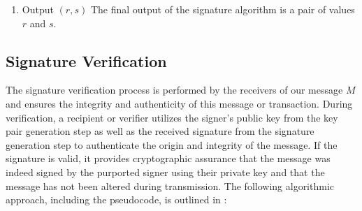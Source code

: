 \begin{enumerate}
	\item Output $(r,s)$\newline
	The final output of the signature algorithm is a pair of values $r$ and $s$.
	\end{enumerate}

\subsection{Signature Verification}\label{sec:sign}
The signature verification process is performed by the receivers of our message $M$ and ensures the integrity and authenticity of this message or transaction. During verification, a recipient or verifier utilizes the signer's public key from the key pair generation step as well as the received signature from the signature generation step to authenticate the origin and integrity of the message. If the signature is valid, it provides cryptographic assurance that the message was indeed signed by the purported signer using their private key and that the message has not been altered during transmission. The following algorithmic approach, including the pseudocode, is outlined in \cite{9422589}:
